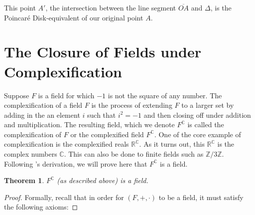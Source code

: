 \documentclass[12pt]{article}
\newcommand{\Z}{\mathbb{Z}}
\newcommand{\R}{\mathbb{R}}
\newcommand{\C}{\mathbb{C}}
\newcommand{\fc}{F^{\C}}
\newcommand{\poincare}{Poincar\'{e} }
\theoremstyle{plain}
\newtheorem{theorem}{Theorem}[section]
\theoremstyle{definition}
\begin{document}
\begin{appendices}
\begin{center}
\end{center}

This point $A'$, the intersection between the line segment $\overline{OA}$ and $\Delta$, is the \poincare Disk-equivalent of our original point $A$.



\newpage 
\section{The Closure of Fields under Complexification} \label{appendixB}

	Suppose $F$ is a field for which $-1$ is not the square of any number. The complexification of a field $F$ is the process of extending $F$ to a larger set by adding in the an element $i$ such that $i^2 = -1$ and then closing off under addition and multiplication. The resulting field, which we denote $F^\C$ is called the complexification of $F$ or the complexified field $F^\C$. One of the core example of complexification is the complexified reals $\R^\C$. As it turns out, this $\R^\C$ is the complex numbers $\C$. This can also be done to finite fields such as $\Z/3\Z$. Following \cite{complexification}'s derivation, we will prove here that $F^\C$ is a field.

\begin{theorem} 
$\fc$ (as described above) is a field.
\end{theorem}

\begin{proof} Formally, recall that in order for $(F,+,\cdot)$ to be a field, it must satisfy the following axioms:


\end{proof}
\end{appendices}
\end{document}
